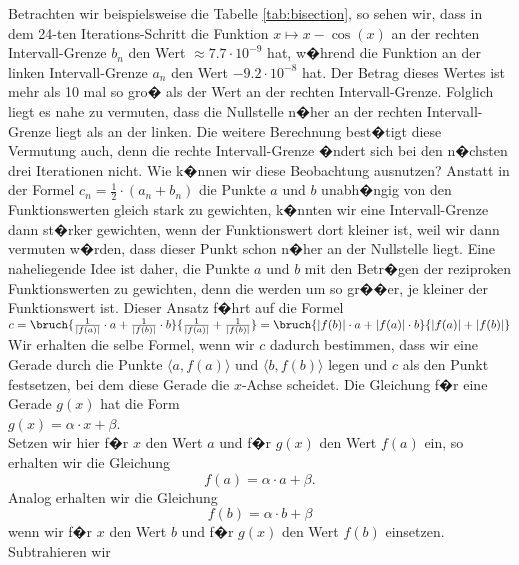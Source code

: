  Betrachten wir beispielsweise die Tabelle \ref{tab:bisection}, so sehen wir, dass
in dem 24-ten Iterations-Schritt die Funktion $x \mapsto x - \cos(x)$ an der rechten
Intervall-Grenze $b_n$ den Wert $\approx 7.7 \cdot 10^{-9}$ hat, w�hrend die Funktion an der
linken Intervall-Grenze $a_n$ den Wert $-9.2 \cdot 10^{-8}$ hat.  Der Betrag dieses Wertes ist
mehr als 10 mal so gro� als der Wert an der rechten Intervall-Grenze.  Folglich liegt es
nahe zu vermuten, dass die Nullstelle n�her an der rechten Intervall-Grenze liegt als an
der linken.  Die weitere Berechnung best�tigt diese Vermutung auch, denn die rechte
Intervall-Grenze �ndert sich bei den n�chsten drei Iterationen nicht.  Wie k�nnen wir
diese Beobachtung ausnutzen?  Anstatt in der Formel $c_n = \frac{1}{2}\cdot(a_n + b_n)$ die
Punkte $a$ und $b$ unabh�ngig von den Funktionswerten gleich stark zu gewichten, k�nnten
wir eine Intervall-Grenze dann st�rker gewichten, wenn der Funktionswert dort kleiner ist,
weil wir dann vermuten w�rden, dass dieser Punkt schon n�her an der Nullstelle liegt.
Eine naheliegende Idee ist daher, die Punkte $a$ und $b$ mit den Betr�gen der reziproken
Funktionswerten zu gewichten, denn die werden um so gr��er, je kleiner der Funktionswert
ist.  Dieser Ansatz f�hrt auf die Formel
\\[0.2cm]
\hspace*{1.3cm} $c = \bruch{\frac{1}{|f(a)|}\cdot a + \frac{1}{|f(b)|}\cdot b}{\frac{1}{|f(a)|} +
  \frac{1}{|f(b)|}} = \bruch{|f(b)|\cdot a + |f(a)|\cdot b}{|f(a)| + |f(b)|}$
\\[0.3cm]
Wir erhalten die selbe Formel, wenn wir $c$ dadurch bestimmen, dass wir eine
Gerade durch die Punkte $\bigl\langle a, f(a)\bigr\rangle$ und $\bigl\langle b, f(b)\bigr\rangle$ legen und
$c$ als 
den Punkt festsetzen, bei dem diese Gerade die $x$-Achse scheidet.  Die Gleichung f�r eine
Gerade $g(x)$ hat die Form
\\[0.2cm]
\hspace*{1.3cm} $g(x) = \alpha \cdot x + \beta$.
\\[0.2cm]
Setzen wir hier f�r $x$ den Wert $a$ und f�r $g(x)$ den Wert $f(a)$ ein, so erhalten wir
die Gleichung
\begin{equation}
  \label{eq:null0}
  f(a) = \alpha \cdot a + \beta.
\end{equation}
Analog erhalten wir die Gleichung
\begin{equation}
  \label{eq:null1}
  f(b) = \alpha \cdot b + \beta
\end{equation}
wenn wir f�r $x$ den Wert $b$ und f�r $g(x)$ den Wert $f(b)$ einsetzen.  Subtrahieren wir
